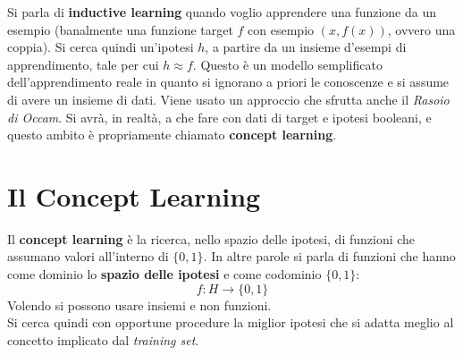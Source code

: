 Si parla di \textbf{inductive learning} quando voglio apprendere una funzione da
un esempio (banalmente una funzione target $f$ con esempio $(x, f(x))$, ovvero
una coppia). Si cerca quindi un'ipotesi $h$, a partire da un insieme d'esempi di
apprendimento, tale per cui $h\approx f$. Questo è un modello semplificato
dell'apprendimento reale in quanto si ignorano a priori le conoscenze e si assume
di avere un insieme di dati. Viene usato un approccio che sfrutta anche il \textit{Rasoio di Occam}.
Si avrà, in realtà, a che fare con dati di target e ipotesi booleani, e questo ambito è propriamente chiamato \textbf{concept learning}.
\newpage

\section{Il Concept Learning}
Il \textbf{concept learning} è la ricerca, nello spazio delle ipotesi, di
funzioni che assumano valori all'interno di $\{0,1\}$. In altre parole si
parla di funzioni che hanno come dominio lo \textbf{spazio delle ipotesi} e
come codominio $\{0,1\}$:
\[f:H\to\{0,1\}\]
Volendo si possono usare insiemi e non funzioni.\\
Si cerca quindi con opportune procedure la miglior ipotesi che si adatta
meglio al concetto implicato dal \textit{training set}.


